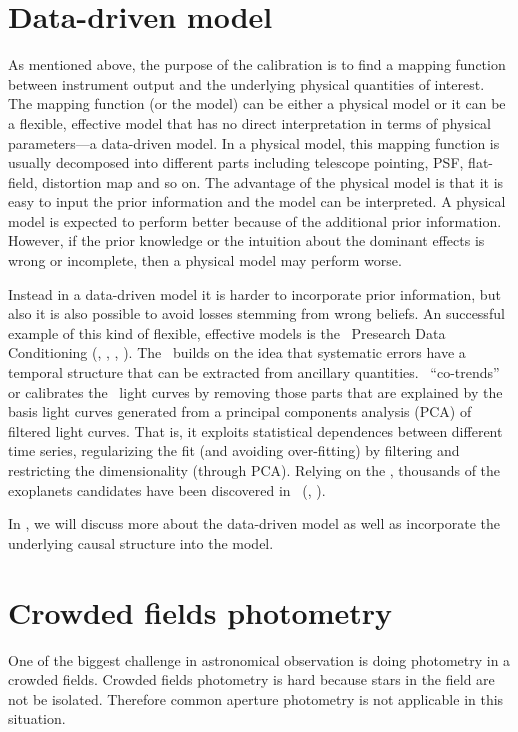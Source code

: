 \section{Data-driven model}
As mentioned above, the purpose of the calibration is to find a mapping function between instrument output and the underlying physical quantities of interest.
The mapping function (or the model) can be either a physical model or it can be a flexible, effective model that has no direct interpretation in terms of physical parameters---a data-driven model.
In a physical model, this mapping function is usually decomposed into different parts including telescope pointing, PSF, flat-field, distortion map and so on.
The advantage of the physical model is that it is easy to input the prior information and the model can be interpreted.
A physical model is expected to perform better because of the additional prior information.
However, if the prior knowledge or the intuition about the dominant effects is wrong or incomplete, then a physical model may perform worse.

Instead in a data-driven model it is harder to incorporate prior information, but also it is also possible to avoid losses stemming from wrong beliefs. 
An successful example of this kind of flexible, effective models is the \kepler\ Presearch Data Conditioning (\pdc, \citealt{pdc1}, \citealt{pdc2}, \citealt{pdc3}). 
The \pdc\ builds on the idea that systematic errors have a temporal structure that can be extracted from ancillary quantities.
\pdc\ ``co-trends'' or calibrates the \kepler\ light curves by removing those parts that are explained by the basis light curves generated from a principal components analysis (PCA) of filtered light curves.
That is, it exploits statistical dependences between different time series, regularizing the fit (and avoiding over-fitting) by filtering and restricting the dimensionality (through PCA).
Relying on the \pdc, thousands of the exoplanets candidates have been discovered in \kepler\ (\citealt{kepler}, \citealt{kepler1}).

In , we will discuss more about the data-driven model as well as incorporate the underlying causal structure into the model.

\section{Crowded fields photometry}
One of the biggest challenge in astronomical observation is doing photometry in a crowded fields.
Crowded fields photometry is hard because stars in the field are not be isolated.
Therefore common aperture photometry is not applicable in this situation.

